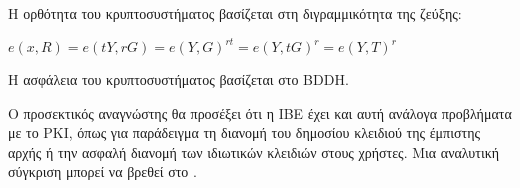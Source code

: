 Η ορθότητα του κρυπτοσυστήματος βασίζεται στη διγραμμικότητα της ζεύξης:
\begin{center}
$e(x,R) = e(tY,rG) = e(Y,G)^{rt} = e(Y,tG)^r = e(Y,T)^r$
\end{center}

Η ασφάλεια του κρυπτοσυστήματος βασίζεται στο \gls{BDDH}. 

O προσεκτικός αναγνώστης θα προσέξει ότι η \gls{IBE} έχει και αυτή ανάλογα προβλήματα με το PKI, όπως για παράδειγμα τη διανομή του δημοσίου κλειδιού της έμπιστης αρχής ή την ασφαλή διανομή των ιδιωτικών κλειδιών στους χρήστες. Μια αναλυτική σύγκριση μπορεί να βρεθεί στο \cite{paterson2003comparison}.
